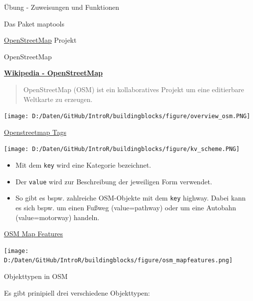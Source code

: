 \documentclass[ignorenonframetext,]{beamer}
\providecommand{\tightlist}{%
  \setlength{\itemsep}{0pt}\setlength{\parskip}{0pt}}
\begin{document}
\begin{frame}[fragile]{Übung - Zuweisungen und Funktionen}
\begin{frame}[fragile]{Das Paket maptools}
\begin{frame}{\href{http://www.openstreetmap.de/}{OpenStreetMap}
Projekt}
\end{frame}

\begin{frame}{OpenStreetMap}

\begin{block}{\href{https://en.wikipedia.org/wiki/OpenStreetMap}{\textbf{Wikipedia
- OpenStreetMap}}}

\begin{quote}
OpenStreetMap (OSM) ist ein kollaboratives Projekt um eine editierbare
Weltkarte zu erzeugen.
\end{quote}

\texttt{[image: D:/Daten/GitHub/IntroR/buildingblocks/figure/overview\_osm.PNG]}

\end{block}

\end{frame}

\begin{frame}[fragile]{\href{https://wiki.openstreetmap.org/wiki/Tags}{Openstreetmap
Tags}}

\texttt{[image: D:/Daten/GitHub/IntroR/buildingblocks/figure/kv\_scheme.PNG]}

\begin{itemize}
\tightlist
\item
  Mit dem \texttt{key} wird eine Kategorie bezeichnet.
\item
  Der \texttt{value} wird zur Beschreibung der jeweiligen Form
  verwendet.
\item
  So gibt es bspw. zahlreiche OSM-Objekte mit dem \texttt{key} highway.
  Dabei kann es sich bspw. um einen Fußweg (value=pathway) oder um eine
  Autobahn (value=motorway) handeln.
\end{itemize}

\end{frame}

\begin{frame}{\href{http://wiki.openstreetmap.org/wiki/DE:Map_Features}{OSM
Map Features}}

\texttt{[image: D:/Daten/GitHub/IntroR/buildingblocks/figure/osm\_mapfeatures.png]}

\end{frame}

\begin{frame}{Objekttypen in OSM}

\begin{block}{Es gibt prinipiell drei verschiedene Objekttypen:}


\end{block}
\end{frame}
\end{frame}
\end{frame}
\end{document}
